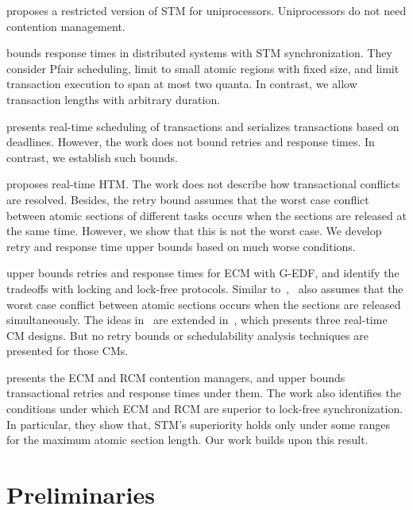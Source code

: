 \documentclass{sig-alternate}
\begin{document}
\cite{manson2006preemptible} proposes a restricted version of STM for uniprocessors. Uniprocessors do not need contention management.

\cite{fahmy2009bounding} bounds response times in distributed  systems with STM synchronization. They consider Pfair scheduling, limit to small atomic regions with fixed size, and limit transaction execution to span at most two quanta. In contrast, we allow transaction lengths with  arbitrary duration. 

\cite{sarni2009real} presents real-time scheduling of transactions and serializes transactions based on deadlines. However, the work does not bound retries and response times. In contrast, we establish such bounds.


\cite{schoeberl2010rttm} proposes real-time HTM. The work does not describe how transactional conflicts are resolved. Besides, the retry bound assumes that the worst case conflict between atomic sections of different tasks occurs when the sections are released at the same time. However, we show that this is not the worst case. We develop retry and response time upper bounds based on much worse conditions.


\cite{key-1} upper bounds retries and response times for  ECM with G-EDF, and identify the tradeoffs with locking and lock-free protocols. Similar to~\cite{schoeberl2010rttm},~\cite{key-1} also assumes that the worst case conflict between atomic sections occurs when the sections are released simultaneously. The ideas in~\cite{key-1} are extended in~\cite{barrosmanaging}, which presents three real-time CM designs. But no retry bounds or schedulability analysis techniques are presented for those CMs. 

\cite{stmconcurrencycontrol:emsoft11} 
presents the ECM and RCM contention managers, and upper bounds transactional retries and response times under them. The work also identifies the conditions under which ECM and RCM are superior to lock-free synchronization. In particular, they show that, STM's superiority holds only under some ranges for the maximum atomic section length. Our work builds upon this result.

\section{Preliminaries}
\label{sec:model}
\end{document}

